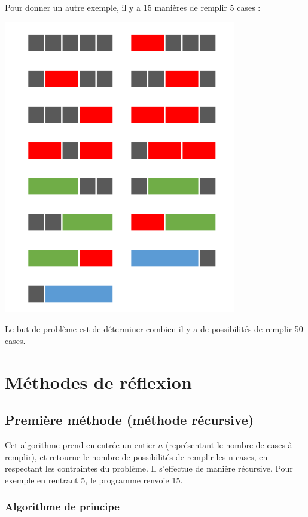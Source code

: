 \documentclass{article}
\begin{document}
\newline Pour donner un autre exemple, il y a 15 manières de remplir 5 cases :
\bigbreak
\begin{center}
\includegraphics[scale = 0.5]{Images/presentation.png}
\end{center}
\bigbreak

Le but de problème est de déterminer combien il y a de possibilités de remplir 50 cases.
\newpage
\section{Méthodes de réflexion}

\subsection{Première méthode (méthode récursive)}

Cet algorithme prend en entrée un entier $n$ (représentant le nombre de cases à remplir), et retourne le nombre de possibilités de remplir les n cases, en respectant les contraintes du problème. Il s'effectue de manière récursive. Pour exemple en rentrant 5, le programme renvoie 15.

\subsubsection{Algorithme de principe}
\end{document}

